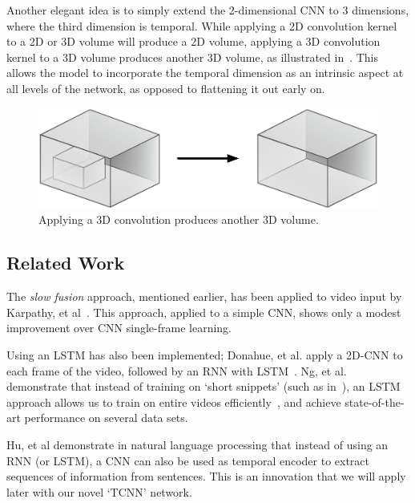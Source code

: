 Another elegant idea is to simply extend the 2-dimensional CNN to 3 dimensions, where the third dimension is temporal. While applying a 2D convolution kernel to a 2D or 3D volume will produce a 2D volume, applying a 3D convolution kernel to a 3D volume produces another 3D volume, as illustrated in~. This allows the model to incorporate the temporal dimension as an intrinsic aspect at all levels of the network, as opposed to flattening it out early on. 
\begin{figure}[ht]
  \centering
  \includegraphics[width=0.7\linewidth]{figs/3dconv}
  \caption{Applying a 3D convolution produces another 3D volume.}
  \label{fig:3dconv}
\end{figure}

\subsection{Related Work}
The \emph{slow fusion} approach, mentioned earlier, has been applied to video input by Karpathy, et al~\cite{cnnvid}. This approach, applied to a simple CNN, shows only a modest improvement over CNN single-frame learning.

Using an LSTM has also been implemented; Donahue, et al. apply a 2D-CNN to each frame of the video, followed by an RNN with LSTM~\cite{ltrcn}. 
Ng, et al. demonstrate that instead of training on `short snippets' (such as in~\cite{cnnvid,stf}), an LSTM approach allows us to train on entire videos efficiently~\cite{snip}, and achieve state-of-the-art performance on several data sets. 

Hu, et al \cite{cnnMNLS} demonstrate in natural language processing that instead of using an RNN (or LSTM), a CNN can also be used as temporal encoder to extract sequences of information from sentences. This is an innovation that we will apply later with our novel `TCNN' network. 

